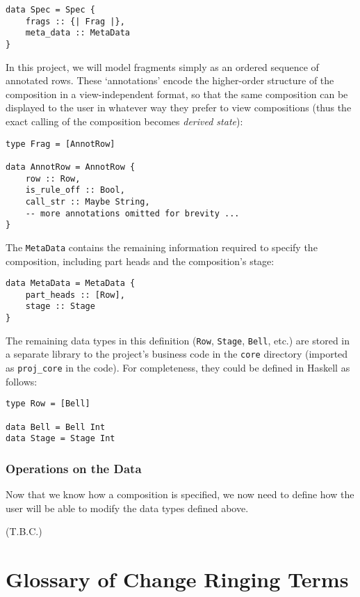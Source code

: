 \documentclass[12pt]{article}
\begin{document}
\begin{verbatim}
data Spec = Spec {
    frags :: {| Frag |},
    meta_data :: MetaData
}
\end{verbatim}

In this project, we will model fragments simply as an ordered sequence of annotated rows.  These
`annotations' encode the higher-order structure of the composition in a view-independent format,
so that the same composition can be displayed to the user in whatever way they prefer to view
compositions (thus the exact calling of the composition becomes \emph{derived state}):

\begin{verbatim}
type Frag = [AnnotRow]

data AnnotRow = AnnotRow {
    row :: Row,
    is_rule_off :: Bool,
    call_str :: Maybe String,
    -- more annotations omitted for brevity ...
}
\end{verbatim}

The \verb|MetaData| contains the remaining information required to specify the composition,
including part heads and the composition's stage:

\begin{verbatim}
data MetaData = MetaData {
    part_heads :: [Row],
    stage :: Stage
}
\end{verbatim}

The remaining data types in this definition (\verb|Row|, \verb|Stage|, \verb|Bell|, etc.) are stored
in a separate library to the project's business code in the \verb|core| directory (imported as
\verb|proj_core| in the code).  For completeness, they could be defined in Haskell as follows:

\begin{verbatim}
type Row = [Bell]

data Bell = Bell Int
data Stage = Stage Int
\end{verbatim}

\subsubsection{Operations on the Data}

Now that we know how a composition is specified, we now need to define how the user will be able to
modify the data types defined above.

(T.B.C.)

\section{Glossary of Change Ringing Terms}
\end{document}
